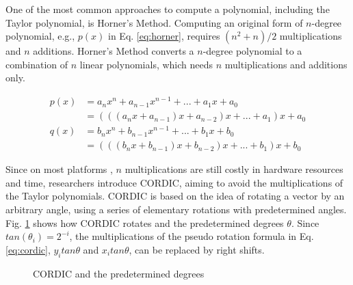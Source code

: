 \documentclass[12pt]{extbook}
\begin{document}
One of the most common approaches to compute a polynomial, including the Taylor polynomial, is Horner's Method. Computing an original form of $n$-degree polynomial, e.g., $p(x)$ in Eq. \ref{eq:horner}, requires $(n^2 + n)/2$ multiplications and $n$ additions. Horner's Method converts a $n$-degree polynomial to a combination of $n$ linear polynomials, which needs $n$ multiplications and additions only.

\begin{equation}
    \label{eq:horner}
    \begin{aligned}
    p(x) &= a_n x^n + a_{n - 1}x^{n - 1} + ... + a_1 x + a_0 \\
         &= (((a_n x + a_{n - 1}) x + a_{n - 2})x + ... + a_1) x + a_0 \\
    q(x) &= b_n x^n + b_{n - 1}x^{n - 1} + ... + b_1 x + b_0 \\
         &= (((b_n x + b_{n - 1}) x + b_{n - 2})x + ... + b_1) x + b_0
    \end{aligned}
    \end{equation}

Since on most platforms \cite{XILINX, X86, CUDA}, $n$ multiplications are still costly in hardware resources and time, researchers introduce CORDIC, aiming to avoid the multiplications of the Taylor polynomials. CORDIC is based on the idea of rotating a vector by an arbitrary angle, using a series of elementary rotations with predetermined angles. Fig. \ref{fig:cordic} shows how CORDIC rotates and the predetermined degrees $\theta$. Since $tan(\theta_i) = 2^{-i}$, the multiplications of the pseudo rotation formula in Eq. \ref{eq:cordic}, $y_itan\theta$ and $x_itan\theta$, can be replaced by right shifts.

\begin{figure}[tbp]
    \caption{CORDIC and the predetermined degrees}
    \label{fig:cordic}
    \end{figure}
\end{document}
